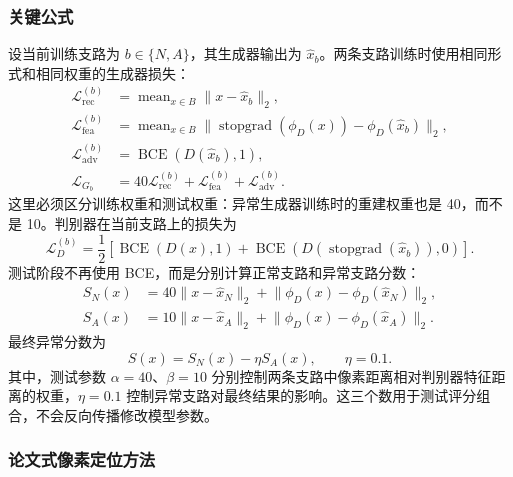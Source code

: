 \documentclass[UTF8,12pt]{ctexart}
\begin{document}
\subsubsection{关键公式}

设当前训练支路为 $b\in\{N,A\}$，其生成器输出为 $\hat{x}_b$。两条支路训练时使用相同形式和相同权重的生成器损失：
\begin{align}
\mathcal{L}_{\mathrm{rec}}^{(b)}
&=\operatorname{mean}_{x\in B}\lVert x-\hat{x}_b\rVert_2,\\
\mathcal{L}_{\mathrm{fea}}^{(b)}
&=\operatorname{mean}_{x\in B}
\lVert\operatorname{stopgrad}(\phi_D(x))-\phi_D(\hat{x}_b)\rVert_2,\\
\mathcal{L}_{\mathrm{adv}}^{(b)}
&=\operatorname{BCE}(D(\hat{x}_b),1),\\
\mathcal{L}_{G_b}
&=40\mathcal{L}_{\mathrm{rec}}^{(b)}
+\mathcal{L}_{\mathrm{fea}}^{(b)}
+\mathcal{L}_{\mathrm{adv}}^{(b)}.
\end{align}
这里必须区分训练权重和测试权重：异常生成器训练时的重建权重也是 40，而不是 10。判别器在当前支路上的损失为
\begin{equation}
\mathcal{L}_{D}^{(b)}
=\frac{1}{2}\left[
\operatorname{BCE}(D(x),1)
+\operatorname{BCE}(D(\operatorname{stopgrad}(\hat{x}_b)),0)
\right].
\end{equation}
测试阶段不再使用 BCE，而是分别计算正常支路和异常支路分数：
\begin{align}
S_N(x)&=40\lVert x-\hat{x}_N\rVert_2
+\lVert\phi_D(x)-\phi_D(\hat{x}_N)\rVert_2,\\
S_A(x)&=10\lVert x-\hat{x}_A\rVert_2
+\lVert\phi_D(x)-\phi_D(\hat{x}_A)\rVert_2.
\end{align}
最终异常分数为
\begin{equation}
S(x)=S_N(x)-\eta S_A(x),\qquad \eta=0.1.
\end{equation}
其中，测试参数 $\alpha=40$、$\beta=10$ 分别控制两条支路中像素距离相对判别器特征距离的权重，$\eta=0.1$ 控制异常支路对最终结果的影响。这三个数用于测试评分组合，不会反向传播修改模型参数。

\subsubsection{论文式像素定位方法}
\end{document}
